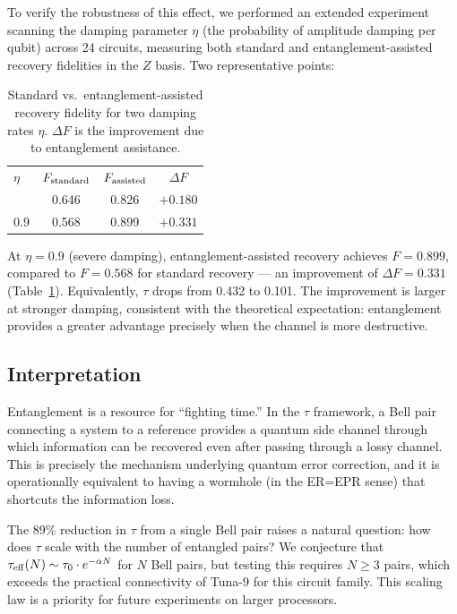 \documentclass[prl,twocolumn,superscriptaddress,longbibliography,floatfix]{revtex4-2}
\newcommand{\tauasym}{\tau}
\begin{document}
To verify the robustness of this effect, we performed an extended
experiment scanning the damping parameter $\eta$ (the probability
of amplitude damping per qubit) across 24 circuits, measuring
both standard and entanglement-assisted recovery fidelities in the
$Z$ basis.  Two representative points:

\begin{table}[t]
\caption{\label{tab:eta_scan}Standard vs.\ entanglement-assisted
recovery fidelity for two damping rates $\eta$.  $\Delta F$ is
the improvement due to entanglement assistance.}
\begin{ruledtabular}
\begin{tabular}{lccc}
$\eta$ & $F_{\rm standard}$ & $F_{\rm assisted}$ & $\Delta F$ \\
\colrule
0.7 & 0.646 & 0.826 & $+0.180$ \\
0.9 & 0.568 & 0.899 & $+0.331$ \\
\end{tabular}
\end{ruledtabular}
\end{table}

At $\eta = 0.9$ (severe damping), entanglement-assisted recovery
achieves $F = 0.899$, compared to $F = 0.568$ for standard recovery
--- an improvement of $\Delta F = 0.331$ (Table~\ref{tab:eta_scan}).
Equivalently, $\tauasym$ drops from 0.432 to 0.101.  The
improvement is larger at stronger damping, consistent with the
theoretical expectation: entanglement provides a greater advantage
precisely when the channel is more destructive.

\subsection{Interpretation}

Entanglement is a resource for ``fighting time.''  In the
$\tauasym$ framework, a Bell pair connecting a system to a
reference provides a quantum side channel through which information
can be recovered even after passing through a lossy channel.
This is precisely the mechanism underlying quantum error correction,
and it is operationally equivalent to having a wormhole (in the
ER=EPR sense) that shortcuts the information loss.

The 89\% reduction in $\tauasym$ from a single Bell pair raises a
natural question: how does $\tauasym$ scale with the number of
entangled pairs?  We conjecture that
$\tauasym_{\rm eff}(N) \sim \tauasym_0 \cdot e^{-\alpha N}$
for $N$ Bell pairs, but testing this requires $N \geq 3$ pairs,
which exceeds the practical connectivity of Tuna-9 for this circuit
family.  This scaling law is a priority for future experiments on
larger processors.
\end{document}
